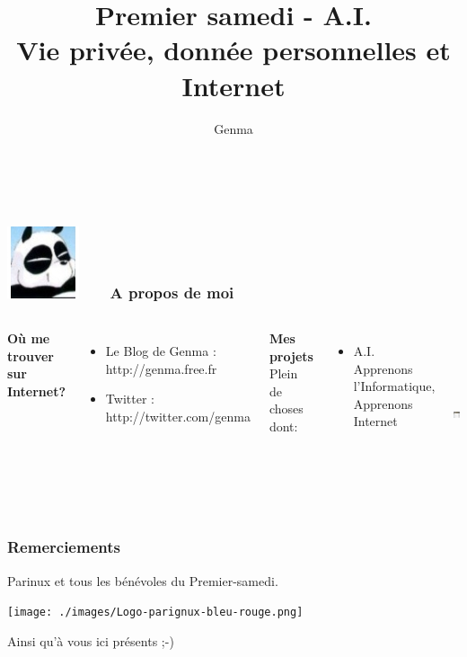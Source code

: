 \documentclass{beamer}
\title[]{Premier samedi - A.I.\up{2} 
\\ Vie privée, donnée personnelles et Internet}
\author{Genma}
\begin{document}
\begin{frame}
	\titlepage
	\vfill
	\begin{center}
		\\[2.5ex]
		{\tiny\CcNote{\CcLongnameByNcSa}}
		\vspace*{-2.5ex}
	\end{center}
\end{frame}

\begin{frame}
\frametitle{\includegraphics[scale=0.4]{./images/Genma.jpg} \ \ \  A propos de moi  }
\begin{columns}[c] 

\textbf{Où me trouver sur Internet?}
\begin{itemize}
\item Le Blog de Genma : http://genma.free.fr
\item Twitter : http://twitter.com/genma
\end{itemize}
\textbf{Mes projets}
\\ Plein de choses dont:
\begin{itemize}
\item A.I. Apprenons l'Informatique, Apprenons Internet
\end{itemize}
\includegraphics[width=5cm,height=5cm]{./images/blog.png} 
\end{columns}
\end{frame}

\begin{frame}
\frametitle{Remerciements}
Parinux et tous les bénévoles du Premier-samedi. 
\\
\begin{center}
\texttt{[image: ./images/Logo-parignux-bleu-rouge.png]}
\end{center}
Ainsi qu'à vous ici présents ;-)
\end{frame}
\end{document}
